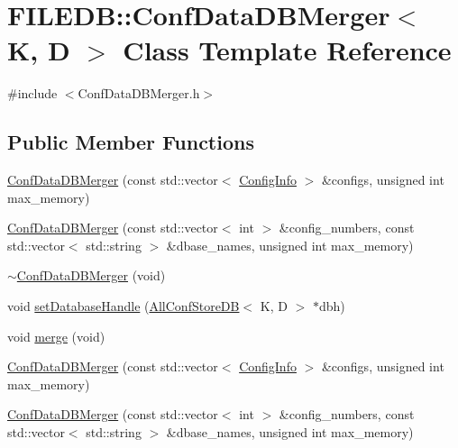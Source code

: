 \hypertarget{classFILEDB_1_1ConfDataDBMerger}{}\section{F\+I\+L\+E\+DB\+:\+:Conf\+Data\+D\+B\+Merger$<$ K, D $>$ Class Template Reference}
\label{classFILEDB_1_1ConfDataDBMerger}


{\ttfamily \#include $<$Conf\+Data\+D\+B\+Merger.\+h$>$}

\subsection*{Public Member Functions}
\begin{DoxyCompactItemize}
\item 
\mbox{\hyperlink{classFILEDB_1_1ConfDataDBMerger_a2d22aeb10cb29cd9acb42cbd042c74d3}{Conf\+Data\+D\+B\+Merger}} (const std\+::vector$<$ \mbox{\hyperlink{classFILEDB_1_1ConfigInfo}{Config\+Info}} $>$ \&configs, unsigned int max\+\_\+memory)
\item 
\mbox{\hyperlink{classFILEDB_1_1ConfDataDBMerger_a495cdfd447f2ed64776d87601c36a05b}{Conf\+Data\+D\+B\+Merger}} (const std\+::vector$<$ int $>$ \&config\+\_\+numbers, const std\+::vector$<$ std\+::string $>$ \&dbase\+\_\+names, unsigned int max\+\_\+memory)
\item 
\mbox{\hyperlink{classFILEDB_1_1ConfDataDBMerger_a1592d55d089ad7ead813ab8d2b955e09}{$\sim$\+Conf\+Data\+D\+B\+Merger}} (void)
\item 
void \mbox{\hyperlink{classFILEDB_1_1ConfDataDBMerger_aba7a50569bcdc1beca3b82536fa5922b}{set\+Database\+Handle}} (\mbox{\hyperlink{classFILEDB_1_1AllConfStoreDB}{All\+Conf\+Store\+DB}}$<$ K, D $>$ $\ast$dbh)
\item 
void \mbox{\hyperlink{classFILEDB_1_1ConfDataDBMerger_a6738f9880645518ba94eccd3b2037f24}{merge}} (void)
\item 
\mbox{\hyperlink{classFILEDB_1_1ConfDataDBMerger_a2d22aeb10cb29cd9acb42cbd042c74d3}{Conf\+Data\+D\+B\+Merger}} (const std\+::vector$<$ \mbox{\hyperlink{classFILEDB_1_1ConfigInfo}{Config\+Info}} $>$ \&configs, unsigned int max\+\_\+memory)
\item 
\mbox{\hyperlink{classFILEDB_1_1ConfDataDBMerger_a495cdfd447f2ed64776d87601c36a05b}{Conf\+Data\+D\+B\+Merger}} (const std\+::vector$<$ int $>$ \&config\+\_\+numbers, const std\+::vector$<$ std\+::string $>$ \&dbase\+\_\+names, unsigned int max\+\_\+memory)
\item 

\end{DoxyCompactItemize}
